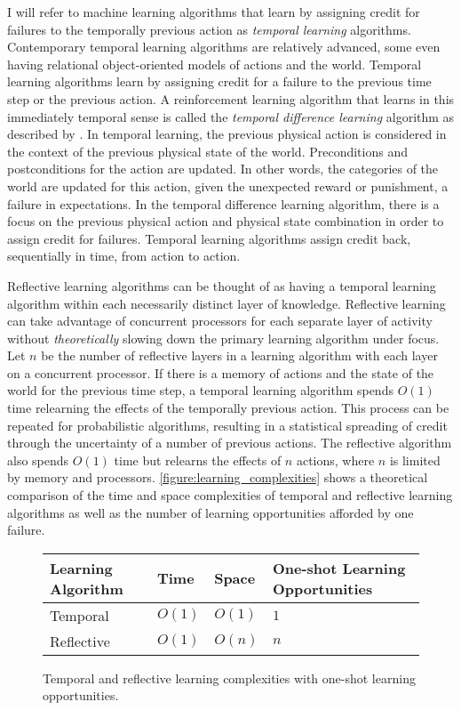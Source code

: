 I will refer to machine learning algorithms that learn by assigning
credit for failures to the temporally previous action as
\emph{temporal learning} algorithms.  Contemporary temporal learning
algorithms are relatively advanced, some even having relational
object-oriented models of actions and the world.  Temporal learning
algorithms learn by assigning credit for a failure to the previous
time step or the previous action.  A reinforcement learning algorithm
that learns in this immediately temporal sense is called the
\emph{temporal difference learning} algorithm as described by
\cite*{kaelbling:1996}.  In temporal learning, the previous physical
action is considered in the context of the previous physical state of
the world.  Preconditions and postconditions for the action are
updated.  In other words, the categories of the world are updated for
this action, given the unexpected reward or punishment, a failure in
expectations.  In the temporal difference learning algorithm, there is
a focus on the previous physical action and physical state combination
in order to assign credit for failures.  Temporal learning algorithms
assign credit back, sequentially in time, from action to action.

Reflective learning algorithms can be thought of as having a temporal
learning algorithm within each necessarily distinct layer of
knowledge.  Reflective learning can take advantage of concurrent
processors for each separate layer of activity without
\emph{theoretically} slowing down the primary learning algorithm under
focus.  Let $n$ be the number of reflective layers in a learning
algorithm with each layer on a concurrent processor.  If there is a
memory of actions and the state of the world for the previous time
step, a temporal learning algorithm spends $O(1)$ time relearning the
effects of the temporally previous action.  This process can be
repeated for probabilistic algorithms, resulting in a statistical
spreading of credit through the uncertainty of a number of previous
actions.  The reflective algorithm also spends $O(1)$ time but
relearns the effects of $n$ actions, where $n$ is limited by memory
and processors.  {\mbox{\autoref{figure:learning_complexities}}} shows
a theoretical comparison of the time and space complexities of
temporal and reflective learning algorithms as well as the number of
learning opportunities afforded by one failure.
\begin{figure}
\center
\begin{tabular}{p{2cm}|p{2cm}|p{2cm}|p{3cm}}
Learning Algorithm & Time   & Space  & One-shot Learning Opportunities \\ \hline
Temporal           & $O(1)$ & $O(1)$ & $1$ \\
Reflective         & $O(1)$ & $O(n)$ & $n$ \\
\end{tabular}
\caption{Temporal and reflective learning complexities with one-shot learning opportunities.}
\label{figure:learning_complexities}
\end{figure}

